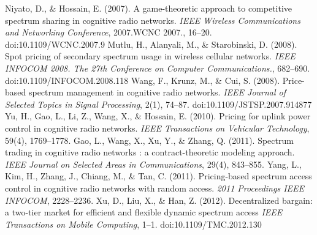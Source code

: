 \begin{thebibliography}{1}
 Niyato, D., \& Hossain, E. (2007). A game-theoretic approach to competitive spectrum sharing in cognitive radio networks. \textit{IEEE Wireless Communications and Networking Conference}, 2007.WCNC 2007., 16–20. doi:10.1109/WCNC.2007.9
 Mutlu, H., Alanyali, M., \& Starobinski, D. (2008). Spot pricing of secondary spectrum usage in wireless cellular networks. \textit{IEEE INFOCOM 2008. The 27th Conference on Computer Communications.}, 682–690. doi:10.1109/INFOCOM.2008.118
 Wang, F., Krunz, M., \& Cui, S. (2008). Price-based spectrum management in cognitive radio networks. \textit{IEEE Journal of Selected Topics in Signal Processing}, 2(1), 74–87. doi:10.1109/JSTSP.2007.914877
 Yu, H., Gao, L., Li, Z., Wang, X., \& Hossain, E. (2010). Pricing for uplink power control in cognitive radio networks. \textit{IEEE Transactions on Vehicular Technology}, 59(4), 1769–1778.
  Gao, L., Wang, X., Xu, Y., \& Zhang, Q. (2011). Spectrum trading in cognitive radio networks : a contract-theoretic modeling approach. \textit{IEEE Journal on Selected Areas in Communications}, 29(4), 843–855.
 Yang, L., Kim, H., Zhang, J., Chiang, M., \& Tan, C. (2011). Pricing-based spectrum access control in cognitive radio networks with random access. \textit{2011 Proceedings IEEE INFOCOM}, 2228–2236.
 Xu, D., Liu, X., \& Han, Z. (2012). Decentralized bargain: a two-tier market for efficient and flexible dynamic spectrum access \textit{IEEE Transactions on Mobile Computing}, 1–1. doi:10.1109/TMC.2012.130


\end{thebibliography}
